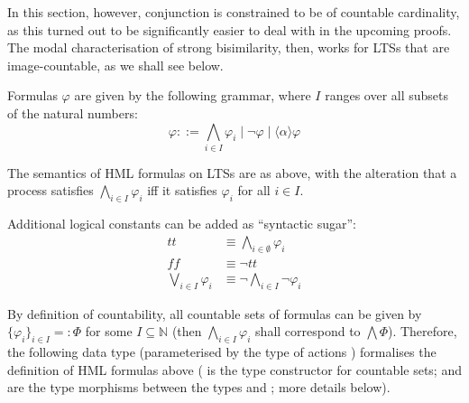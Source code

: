 \begin{isabellebody}
\begin{isamarkuptext}
In this section, however, conjunction is constrained to be of countable cardinality, as this turned out to be significantly easier to deal with in the upcoming proofs. The modal characterisation of strong bisimilarity, then, works for LTSs that are image-countable, as we shall see below.

Formulas $\varphi$ are given by the following grammar, where $I$ ranges over all subsets of the natural numbers:
$$\varphi ::= \textstyle\bigwedge_{i \in I} \varphi_i \mid \neg\varphi \mid \langle\alpha\rangle\varphi$$

The semantics of HML formulas on LTSs are as above, with the alteration that a process satisfies $\bigwedge_{i \in I} \varphi_i$ iff it satisfies $\varphi_i$ for all $i \in I$.

Additional logical constants can be added as \enquote{syntactic sugar}:
\begin{align*}
    t\!t &\equiv \textstyle\bigwedge_{i \in \emptyset} \varphi_i \\
    f\!\!f &\equiv \neg t\!t \\
    \textstyle\bigvee_{i \in I} \varphi_i &\equiv \neg \textstyle\bigwedge_{i \in I} \neg\varphi_i
\end{align*}%
\end{isamarkuptext}\isamarkuptrue%
%
\isadelimdocument
%
\endisadelimdocument
%
\isatagdocument
%
\isamarkuptrue%
%
\isamarkuptrue%
%
\endisatagdocument
{\isafolddocument}%
%
\isadelimdocument
%
\endisadelimdocument
%
\begin{isamarkuptext}%
By definition of countability, all countable sets of formulas can be given by $\{\varphi_i\}_{i \in I} =: \Phi$ for some $I \subseteq \mathbb{N}$ (then $\bigwedge_{i \in I} \varphi_i$ shall correspond to $\bigwedge \Phi$). Therefore, the following data type (parameterised by the type of actions ) formalises the definition of HML formulas above ( is the type constructor for countable sets;  and  are the type morphisms between the types  and ; more details below).


\end{isamarkuptext}
\end{isabellebody}
